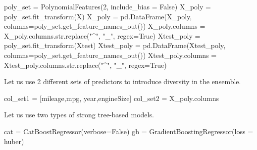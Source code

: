 \documentclass[
  letterpaper,
  DIV=11,
  numbers=noendperiod]{scrreprt}
\newenvironment{Shaded}{\begin{snugshade}}{\end{snugshade}}
\newcommand{\BuiltInTok}[1]{\textcolor[rgb]{0.00,0.23,0.31}{#1}}
\newcommand{\DecValTok}[1]{\textcolor[rgb]{0.68,0.00,0.00}{#1}}
\newcommand{\NormalTok}[1]{\textcolor[rgb]{0.00,0.23,0.31}{#1}}
\newcommand{\OperatorTok}[1]{\textcolor[rgb]{0.37,0.37,0.37}{#1}}
\newcommand{\StringTok}[1]{\textcolor[rgb]{0.13,0.47,0.30}{#1}}
\newcommand{\VariableTok}[1]{\textcolor[rgb]{0.07,0.07,0.07}{#1}}
\begin{document}
\begin{Shaded}
\begin{Highlighting}[]
\NormalTok{poly\_set }\OperatorTok{=}\NormalTok{ PolynomialFeatures(}\DecValTok{2}\NormalTok{, include\_bias }\OperatorTok{=} \VariableTok{False}\NormalTok{)}
\NormalTok{X\_poly }\OperatorTok{=}\NormalTok{ poly\_set.fit\_transform(X)}
\NormalTok{X\_poly }\OperatorTok{=}\NormalTok{ pd.DataFrame(X\_poly, columns}\OperatorTok{=}\NormalTok{poly\_set.get\_feature\_names\_out())}
\NormalTok{X\_poly.columns }\OperatorTok{=}\NormalTok{ X\_poly.columns.}\BuiltInTok{str}\NormalTok{.replace(}\StringTok{"\^{}"}\NormalTok{, }\StringTok{"\_"}\NormalTok{, regex}\OperatorTok{=}\VariableTok{True}\NormalTok{)}
\NormalTok{Xtest\_poly }\OperatorTok{=}\NormalTok{ poly\_set.fit\_transform(Xtest)}
\NormalTok{Xtest\_poly }\OperatorTok{=}\NormalTok{ pd.DataFrame(Xtest\_poly, columns}\OperatorTok{=}\NormalTok{poly\_set.get\_feature\_names\_out())}
\NormalTok{Xtest\_poly.columns }\OperatorTok{=}\NormalTok{ Xtest\_poly.columns.}\BuiltInTok{str}\NormalTok{.replace(}\StringTok{"\^{}"}\NormalTok{, }\StringTok{"\_"}\NormalTok{, regex}\OperatorTok{=}\VariableTok{True}\NormalTok{)}
\end{Highlighting}
\end{Shaded}

Let us use 2 different sets of predictors to introduce diversity in the
ensemble.

\begin{Shaded}
\begin{Highlighting}[]
\NormalTok{col\_set1 }\OperatorTok{=}\NormalTok{ [}\StringTok{\textquotesingle{}mileage\textquotesingle{}}\NormalTok{,}\StringTok{\textquotesingle{}mpg\textquotesingle{}}\NormalTok{, }\StringTok{\textquotesingle{}year\textquotesingle{}}\NormalTok{,}\StringTok{\textquotesingle{}engineSize\textquotesingle{}}\NormalTok{]}
\NormalTok{col\_set2 }\OperatorTok{=}\NormalTok{ X\_poly.columns}
\end{Highlighting}
\end{Shaded}

Let us use two types of strong tree-based models.

\begin{Shaded}
\begin{Highlighting}[]
\NormalTok{cat }\OperatorTok{=}\NormalTok{ CatBoostRegressor(verbose}\OperatorTok{=}\VariableTok{False}\NormalTok{)}
\NormalTok{gb }\OperatorTok{=}\NormalTok{ GradientBoostingRegressor(loss }\OperatorTok{=} \StringTok{\textquotesingle{}huber\textquotesingle{}}\NormalTok{)}
\end{Highlighting}
\end{Shaded}
\end{document}
